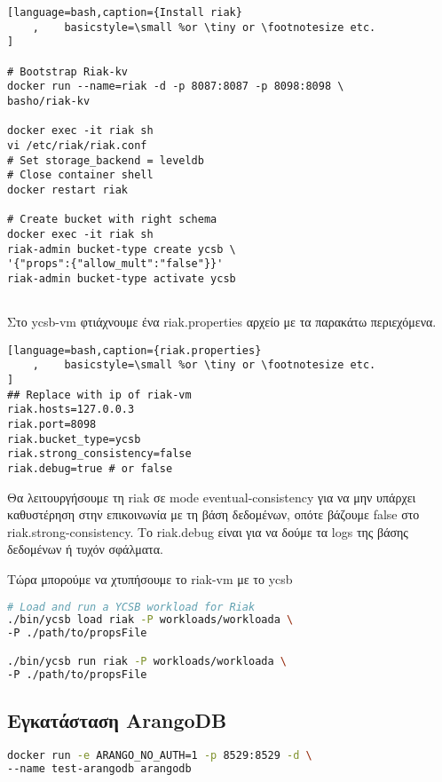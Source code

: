 \documentclass[conference]{IEEEtran}
\begin{document}
\begin{lstlisting}[language=bash,caption={Install riak}
    ,    basicstyle=\small %or \tiny or \footnotesize etc.
]

# Bootstrap Riak-kv
docker run --name=riak -d -p 8087:8087 -p 8098:8098 \
basho/riak-kv

docker exec -it riak sh
vi /etc/riak/riak.conf
# Set storage_backend = leveldb
# Close container shell
docker restart riak

# Create bucket with right schema
docker exec -it riak sh
riak-admin bucket-type create ycsb \
'{"props":{"allow_mult":"false"}}'
riak-admin bucket-type activate ycsb


\end{lstlisting}
Στο ycsb-vm φτιάχνουμε ένα riak.properties αρχείο με τα παρακάτω περιεχόμενα.
\begin{lstlisting}[language=bash,caption={riak.properties}
    ,    basicstyle=\small %or \tiny or \footnotesize etc.
]
## Replace with ip of riak-vm
riak.hosts=127.0.0.3
riak.port=8098
riak.bucket_type=ycsb
riak.strong_consistency=false
riak.debug=true # or false
\end{lstlisting}
Θα λειτουργήσουμε τη riak σε mode eventual-consistency για να μην υπάρχει 
καθυστέρηση στην επικοινωνία με τη βάση δεδομένων, οπότε βάζουμε false 
στο riak.strong-consistency.
Το riak.debug είναι για να δούμε τα logs της βάσης δεδομένων ή τυχόν σφάλματα.

Τώρα μπορούμε να χτυπήσουμε το riak-vm με το ycsb
\begin{lstlisting}[language=bash
    ,    basicstyle=\small %or \tiny or \footnotesize etc.
]
# Load and run a YCSB workload for Riak
./bin/ycsb load riak -P workloads/workloada \
-P ./path/to/propsFile

./bin/ycsb run riak -P workloads/workloada \
-P ./path/to/propsFile

\end{lstlisting}





\subsection{Εγκατάσταση ArangoDB}

\begin{lstlisting}[language=bash
    ,    basicstyle=\small %or \tiny or \footnotesize etc.
]
docker run -e ARANGO_NO_AUTH=1 -p 8529:8529 -d \
--name test-arangodb arangodb
\end{lstlisting}
\end{document}
